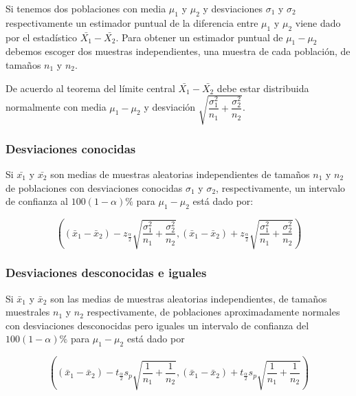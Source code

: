 \documentclass[
]{krantz}
\begin{document}
Si tenemos dos poblaciones con media \(\mu_1\) y \(\mu_2\) y desviaciones \(\sigma_1\) y \(\sigma_2\) respectivamente un estimador puntual de la diferencia entre \(\mu_1\) y \(\mu_2\) viene dado por el estadístico \(\bar{X_1}-\bar{X_2}\). Para obtener un estimador puntual de \(\mu_1-\mu_2\) debemos escoger dos muestras independientes, una muestra de cada población, de tamaños \(n_1\) y \(n_2\).

De acuerdo al teorema del límite central \(\bar{X_1}-\bar{X_2}\) debe estar distribuida normalmente con media \(\mu_1 - \mu_2\) y desviación \(\sqrt{\dfrac{\sigma_1^2}{n_1} + \dfrac{\sigma_2^2}{n_2}}\).

\hypertarget{desviaciones-conocidas}{%
\subsubsection{Desviaciones conocidas}\label{desviaciones-conocidas}}

Si \(\bar{x_1}\) y \(\bar{x_2}\) son medias de muestras aleatorias independientes de tamaños \(n_1\) y \(n_2\) de poblaciones con desviaciones conocidas \(\sigma_1\) y \(\sigma_2\), respectivamente, un intervalo de confianza al \(100\left(1-\alpha\right)\%\) para \(\mu_1-\mu_2\) está dado por:

\begin{equation} 
\left( \left( \bar{x}_1 - \bar{x}_2 \right) - z_{\frac{\alpha}{2}}\sqrt{\dfrac{\sigma_1^2}{n_1} + \dfrac{\sigma_2^2}{n_2}} , \left( \bar{x}_1 - \bar{x}_2 \right) + z_{\frac{\alpha}{2}}\sqrt{\dfrac{\sigma_1^2}{n_1} + \dfrac{\sigma_2^2}{n_2}} \right) 
\label{eq:ic2msc}
\end{equation}

\hypertarget{desviaciones-desconocidas-e-iguales}{%
\subsubsection{Desviaciones desconocidas e iguales}\label{desviaciones-desconocidas-e-iguales}}

Si \(\bar{x}_1\) y \(\bar{x}_2\) son las medias de muestras aleatorias independientes, de tamaños muestrales \(n_1\) y \(n_2\) respectivamente, de poblaciones aproximadamente normales con desviaciones desconocidas pero iguales un intervalo de confianza del \(100\left(1-\alpha \right)\%\) para \(\mu_1 - \mu_2\) está dado por

\begin{equation} 
\left( \left( \bar{x}_1 - \bar{x}_2 \right) - t_{\frac{\alpha}{2}}s_p\sqrt{\dfrac{1}{n_1} + \dfrac{1}{n_2}} , \left( \bar{x}_1 - \bar{x}_2 \right) + t_{\frac{\alpha}{2}}s_p\sqrt{\dfrac{1}{n_1} + \dfrac{1}{n_2}} \right) 
\label{eq:ic2msd}
\end{equation}
\end{document}
